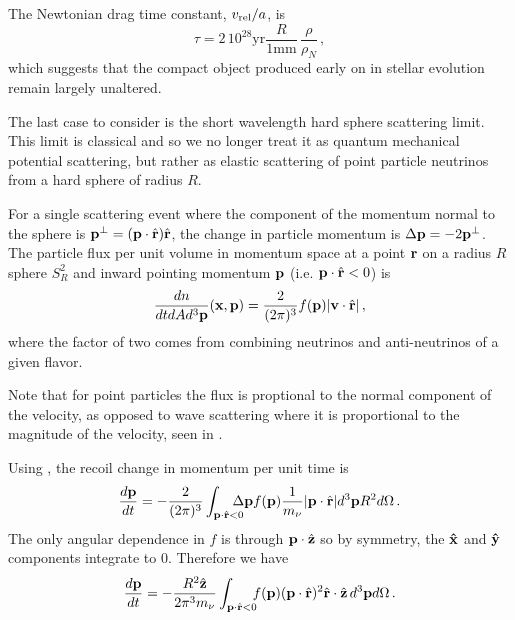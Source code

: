 The Newtonian drag time constant, $v_{\rm rel}/a$, is
\begin{equation}
\tau= 2\,10^{28}\text{yr}\frac{R}{1\text{mm}}\,\frac{\rho}{\rho_N}\,,
\end{equation}
which suggests that the compact object produced early on in stellar evolution remain largely unaltered.

The last case to consider is the short wavelength hard sphere scattering limit.  This limit is classical and so we no longer treat it as quantum mechanical potential scattering, but rather as elastic scattering of point particle neutrinos from a hard sphere of radius $R$.  

For a single scattering event where the component of the momentum normal to the sphere is ${\bf p}^\perp=({\bf p}\cdot \hat {\bf r}) \hat {\bf r}$, the change in particle momentum is  $\Delta {\bf p}=-2{\bf p}^\perp$. The particle flux per unit volume in momentum space at a point ${\bf r}$ on a radius $R$ sphere $S_R^2$ and inward pointing momentum ${\bf p}$ (i.e. ${\bf p}\cdot \hat{\bf  r}<0$) is
\begin{equation}\label{dn_classical}
\frac{dn}{dtd Ad^3{\bf p}}({\bf x},{\bf p})=\frac{2}{(2\pi)^3}f({\bf p})|{\bf v}\cdot \hat{\bf r}|\,,
\end{equation}
where the factor of two comes from combining neutrinos and anti-neutrinos of a given flavor.  

Note that for point particles the flux is proptional to the normal component of the velocity, as opposed to wave scattering where it is proportional to the magnitude of the velocity, seen in .

Using , the recoil change in momentum per unit time is  
\begin{equation}
\frac{d{\bf p}}{dt}= -\frac{2}{(2\pi)^3}\int_{{\bf p}\cdot \hat{\bf r}<0} \!\!\!\!\!\!\Delta {\bf p}  f({\bf p}) \frac{1}{m_\nu}|{\bf p}\cdot \hat{\bf r}| d^3{\bf p}R^2d\Omega\,.
\end{equation}
The only angular dependence in $f$ is through ${\bf p}\cdot \hat {\bf z}$ so by symmetry, the ${\bf \hat x}$ and ${\bf \hat y}$ components integrate to $0$.  Therefore we have
\begin{equation}
\frac{d{\bf p}}{dt}=-\frac{R^2\hat{\bf z}}{2\pi^3m_\nu}\int_{{\bf p}\cdot \hat{\bf r}<0}\!\!\!   f({\bf p}) ({\bf p}\cdot \hat{\bf r})^2 \hat {\bf r}\cdot\hat{\bf z}\, d^3{\bf p}d\Omega\,.  
\end{equation}

